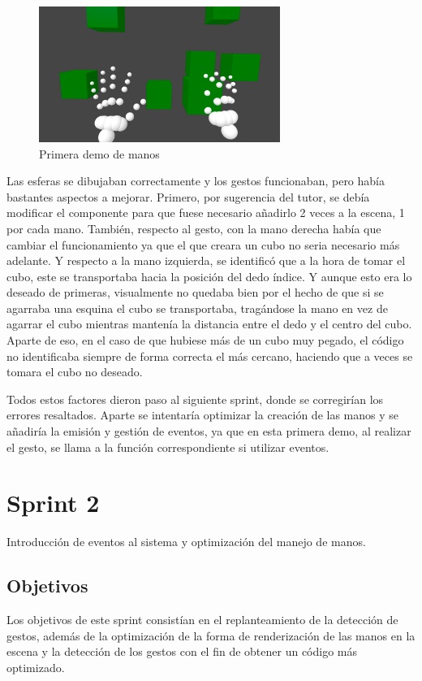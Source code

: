 \documentclass[a4paper, 12pt]{book}
\begin{document}
\begin{figure}[H] 
  \centering
  \includegraphics[width=0.7\textwidth]{img/primeras_manos.jpg} 
  \caption{Primera demo de manos}
  \label{fig:sprint1}
\end{figure}

Las esferas se dibujaban correctamente y los gestos funcionaban, pero había bastantes aspectos a mejorar. Primero, por sugerencia del tutor,
se debía modificar el componente para que fuese necesario añadirlo 2 veces a la escena, 1 por cada mano. También, respecto al gesto, con la mano derecha había que cambiar el funcionamiento
ya que el que creara un cubo no seria necesario más adelante. Y respecto a la mano izquierda, se identificó que a la hora de tomar el cubo, este se transportaba hacia la posición del dedo índice. 
Y aunque esto era lo deseado de primeras, visualmente no quedaba bien por el hecho de que si se agarraba una esquina el cubo se transportaba, tragándose la mano en vez de agarrar el cubo mientras mantenía la distancia entre el dedo y el centro del cubo. 
Aparte de eso, en el caso de que hubiese más de un cubo muy pegado, el código no identificaba siempre de forma correcta el más cercano, haciendo que a veces se tomara el cubo no deseado.

Todos estos factores dieron paso al siguiente sprint, donde se corregirían los errores resaltados. Aparte se intentaría optimizar la creación de las manos y se añadiría la emisión y gestión de eventos, ya que en esta primera demo, al realizar el gesto, se llama a la función correspondiente si utilizar eventos. 

\section{Sprint 2}
\label{sec:sprint2}
Introducción de eventos al sistema y optimización del manejo de manos. 

\subsection{Objetivos}
\label{subsec:objetivo-principal2}
Los objetivos de este sprint consistían en el replanteamiento de la detección de gestos, además de la optimización de la forma de renderización de las manos en la escena y la detección de los gestos con el fin de obtener un código más optimizado. 
\end{document}

